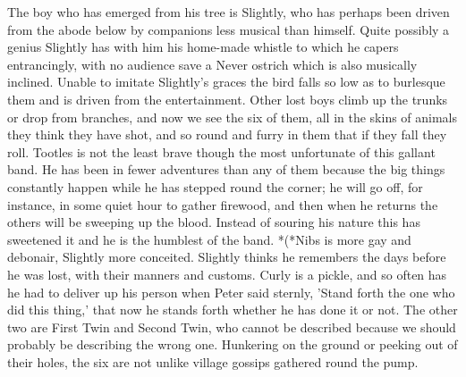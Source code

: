 \begin{stagedir}
The boy who has emerged from his tree is Slightly,
who has perhaps been driven from the abode below by companions less musical than himself.
Quite possibly a genius Slightly has with him his home-made whistle to which he capers entrancingly,
with no audience save a Never ostrich which is also musically inclined.
Unable to imitate Slightly's graces the bird falls so low as to burlesque them
and is driven from the entertainment.
Other lost boys climb up the trunks or drop from branches,
and now we see the six of them, all in the skins of animals they think they have shot,
and so round and furry in them that if they fall they roll.
Tootles is not the least brave though the most unfortunate of this gallant band.
He has been in fewer adventures than any of them
because the big things constantly happen while he has stepped round the corner;
he will go off, for instance, in some quiet hour to gather firewood,
and then when he returns the others will be sweeping up the blood.
Instead of souring his nature this has sweetened it and he is the humblest of the band.
*(*Nibs is more gay and debonair, Slightly more conceited.
Slightly thinks he remembers the days before he was lost, with their manners and customs.
Curly is a pickle, and so often has he had to deliver up his person when Peter said sternly,
'Stand forth the one who did this thing,' that now he stands forth whether he has done it or not.
The other two are First Twin and Second Twin,
who cannot be described because we should probably be describing the wrong one.
Hunkering on the ground or peeking out of their holes,
the six are not unlike village gossips gathered round the pump.
\end{stagedir}

